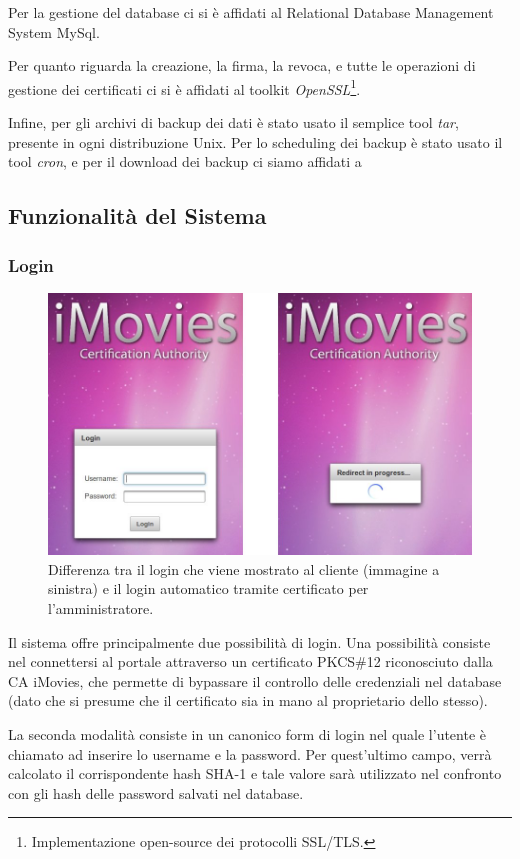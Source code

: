 \documentclass{article}
\begin{document}
Per la gestione del database ci si è affidati al  Relational Database Management System MySql.

Per quanto riguarda la creazione, la firma, la revoca, e tutte le operazioni di gestione dei certificati ci si è affidati al toolkit \emph{OpenSSL}\footnote{Implementazione open-source dei protocolli SSL/TLS.}. 

Infine, per gli archivi di backup dei dati è stato usato il semplice tool \emph{tar}, presente in ogni distribuzione Unix. Per lo scheduling dei backup è stato usato il tool \emph{cron}, e per il download dei backup ci siamo affidati a   



\subsection{Funzionalità del Sistema}
\subsubsection*{Login}
\begin{figure}[h!]
\centering
\includegraphics[width=\textwidth]{img/login}
\caption{Differenza tra il login che viene mostrato al cliente (immagine a sinistra) e il login automatico tramite certificato per l'amministratore.}
\end{figure}
Il sistema offre principalmente due possibilità di login. Una possibilità consiste nel connettersi al portale attraverso un certificato PKCS\#12 riconosciuto dalla CA iMovies, che permette di bypassare il controllo delle credenziali nel database (dato che si presume che il certificato sia in mano al proprietario dello stesso).
\par La seconda modalità consiste in un canonico form di login nel quale l'utente è chiamato ad inserire lo username e la password. Per quest'ultimo campo, verrà calcolato il corrispondente hash SHA-1 e tale valore sarà utilizzato nel confronto con gli hash delle password salvati nel database.
\end{document}
